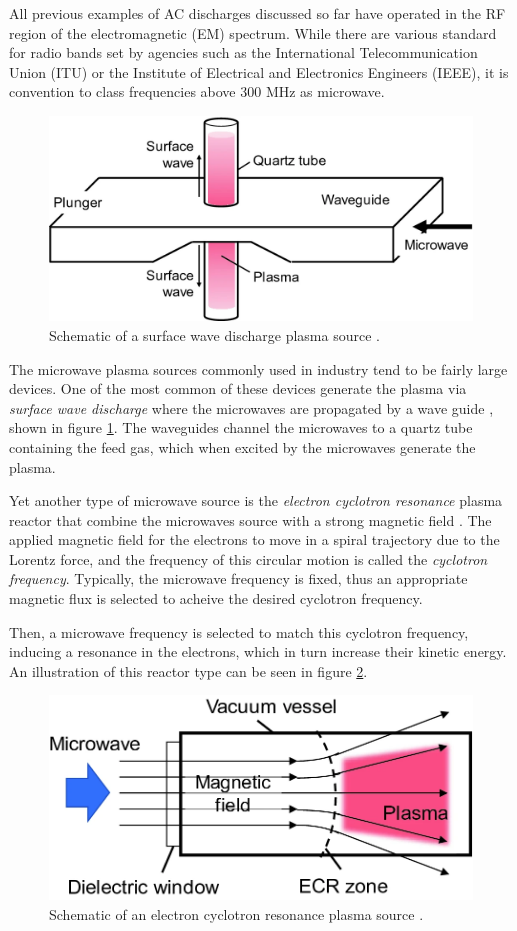 All previous examples of AC discharges discussed so far have operated in the RF region of the electromagnetic (EM) spectrum. While there are various standard for radio bands set by agencies such as the International Telecommunication Union (ITU) or the Institute of Electrical and Electronics Engineers (IEEE), it is convention to class frequencies above 300 MHz as microwave. 

\begin{figure}[h!]
	\centering
	\includegraphics[width=0.6\linewidth]{chapter_2/figures/surface_wave_discharge.png}
	\caption{Schematic of a surface wave discharge plasma source \cite{Toyoda2020}.}
	\label{fig:surface_wave_discharge}
\end{figure} 

The microwave plasma sources commonly used in industry tend to be fairly large devices. One of the most common of these devices generate the plasma via \textit{surface wave discharge} where the microwaves are propagated by a wave guide \cite{Toyoda2020}, shown in figure \ref{fig:surface_wave_discharge}. The waveguides channel the microwaves to a quartz tube containing the feed gas, which when excited by the microwaves generate the plasma.  

Yet another type of microwave source is the \textit{electron cyclotron resonance} plasma reactor that combine the microwaves source with a strong magnetic field \cite{Toyoda2020}. The applied magnetic field for the electrons to move in a spiral trajectory due to the Lorentz force, and the frequency of this circular motion is called the \textit{cyclotron frequency}. Typically, the microwave frequency is fixed, thus an appropriate magnetic flux is selected to acheive the desired cyclotron frequency.

Then, a microwave frequency is selected to match this cyclotron frequency, inducing a resonance in the electrons, which in turn increase their kinetic energy. An illustration of this reactor type can be seen in figure \ref{fig:electron_cyclotron_resonance}. 

\begin{figure}[h!]
	\centering
	\includegraphics[width=0.55\linewidth]{chapter_2/figures/electron_cyclotron_resonance.png}
	\caption{Schematic of an electron cyclotron resonance plasma source \cite{Toyoda2020}.}
	\label{fig:electron_cyclotron_resonance}
\end{figure} 

